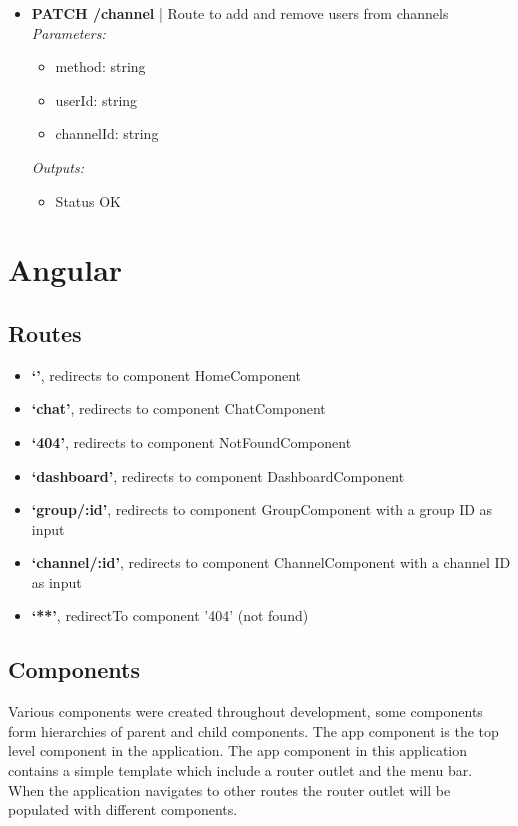 \documentclass[11pt, conference,letterpaper]{IEEEtran}
\begin{document}
\begin{itemize}
    \item \textbf{PATCH /channel} | Route to add and remove users from channels
        \\ \textit{Parameters: }
        \begin{itemize}
            \item method: string
            \item userId: string
            \item channelId: string
        \end{itemize}
        \textit{Outputs: }
        \begin{itemize}
            \item Status OK
        \end{itemize}
\end{itemize}

\newpage
\section{Angular}
\subsection{Routes}
\begin{itemize}
    \item \textbf{`'}, redirects to component HomeComponent
    \item \textbf{`chat'}, redirects to component ChatComponent
    \item \textbf{`404'}, redirects to component NotFoundComponent
    \item \textbf{`dashboard'}, redirects to component DashboardComponent
    \item \textbf{`group/:id'}, redirects to component GroupComponent with a group ID as input
    \item \textbf{`channel/:id'}, redirects to component ChannelComponent with a channel ID as input
    \item \textbf{`**'}, redirectTo component '404' (not found)
\end{itemize}

\subsection{Components}
\par Various components were created throughout development, some components form hierarchies of parent and child components. The app component is the top level component in the application. The app component in this application contains a simple template which include a router outlet and the menu bar. When the application navigates to other routes the router outlet will be populated with different components.
\end{document}
